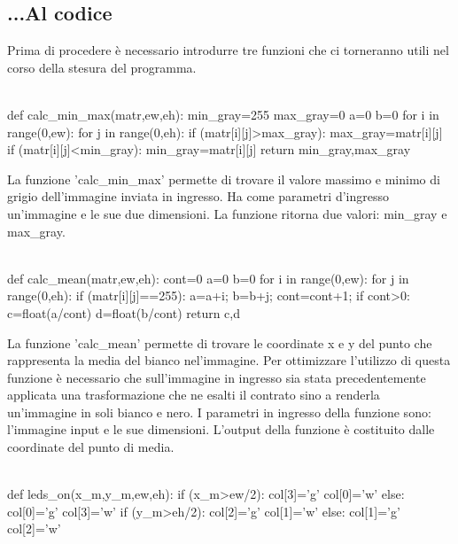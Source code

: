 \documentclass[12pt]{article}
\begin{document}
{\subsection{...Al codice}
\vspace{1cm} Prima di procedere \`e necessario introdurre tre funzioni che ci torneranno utili nel corso della stesura del programma. 
\\
\\


 \begin{codice}
 	def calc_min_max(matr,ew,eh):
 	min_gray=255
 	max_gray=0
 	a=0
 	b=0
 	for i in range(0,ew):
 	   for j in range(0,eh):
 	      if (matr[i][j]>max_gray):
 	         max_gray=matr[i][j]
 	      if (matr[i][j]<min_gray):
 	         min_gray=matr[i][j]
 	return min_gray,max_gray
 \end{codice}

\vspace{1cm} La funzione 'calc\_min\_max' permette di trovare il valore massimo e minimo di grigio dell'immagine inviata in ingresso. Ha come parametri d'ingresso un'immagine e le sue due dimensioni. La funzione ritorna due valori: min\_gray e max\_gray.
\\
\\


\begin{codice}
def calc_mean(matr,ew,eh):
cont=0
a=0
b=0
for i in range(0,ew):
   for j in range(0,eh):
      if (matr[i][j]==255):
         a=a+i;
         b=b+j;
         cont=cont+1;
      if cont>0:
         c=float(a/cont)
         d=float(b/cont)
return c,d

\end{codice}

\vspace{1cm} La funzione 'calc\_mean' permette di trovare le coordinate x e y del punto che rappresenta la media del bianco nel'immagine. Per ottimizzare l'utilizzo di questa funzione \`e necessario che sull'immagine in ingresso sia stata precedentemente applicata una trasformazione che ne esalti il contrato sino a renderla un'immagine in soli bianco e nero. I parametri in ingresso della funzione sono: l'immagine input e le sue dimensioni. L'output della funzione è costituito dalle coordinate del punto di media.
\\
\\
\begin{codice}
	def leds_on(x_m,y_m,ew,eh):
	if (x_m>ew/2):
	   col[3]='g'
	   col[0]='w'
	else:
	   col[0]='g'
	   col[3]='w'
	if (y_m>eh/2):
	   col[2]='g'
	   col[1]='w'
	else:
	   col[1]='g'
	   col[2]='w'
\end{codice}

}
\end{document}
